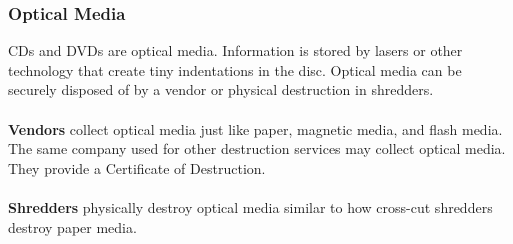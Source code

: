 \subsubsection{Optical Media}
CDs and DVDs are optical media. Information is stored by lasers or other technology that create tiny indentations in the disc. Optical media can be securely disposed of by a vendor or physical destruction in shredders.\\\\
\textbf{Vendors} collect optical media just like paper, magnetic media, and flash media. The same company used for other destruction services may collect optical media. They provide a Certificate of Destruction.\\\\
\textbf{Shredders} physically destroy optical media similar to how cross-cut shredders destroy paper media.
